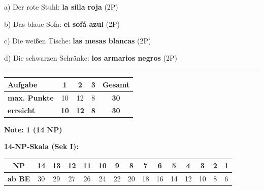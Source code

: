 \documentclass[11pt, a4paper]{article}
\newcommand{\lsg}[1]{\textcolor{loesung}{\textbf{#1}}}
\begin{document}
\noindent
a) Der rote Stuhl: \lsg{la silla roja} \hfill (2P)

\vspace{0.8em}

\noindent
b) Das blaue Sofa: \lsg{el sofá azul} \hfill (2P)

\vspace{0.8em}

\noindent
c) Die weißen Tische: \lsg{las mesas blancas} \hfill (2P)

\vspace{0.8em}

\noindent
d) Die schwarzen Schränke: \lsg{los armarios negros} \hfill (2P)


\vspace{25pt}
\hrule
\vspace{10pt}

\noindent
\begin{tabularx}{\textwidth}{|X|c|c|c||c|}
\hline
\textbf{Aufgabe} & 1 & 2 & 3 & \textbf{Gesamt} \\
\hline
\textbf{max. Punkte} & 10 & 12 & 8 & \textbf{30} \\
\hline
\textbf{erreicht} & \lsg{10} & \lsg{12} & \lsg{8} & \lsg{30} \\
\hline
\end{tabularx}

\vspace{10pt}

\begin{flushright}
\textbf{Note:} \lsg{1 (14 NP)}
\end{flushright}

\vspace{1em}

\textbf{14-NP-Skala (Sek I):}

\begin{tabular}{|c|c|c|c|c|c|c|c|c|c|c|c|c|c|c|}
\hline
\textbf{NP} & 14 & 13 & 12 & 11 & 10 & 9 & 8 & 7 & 6 & 5 & 4 & 3 & 2 & 1 \\
\hline
\textbf{ab BE} & 30 & 29 & 27 & 26 & 24 & 22 & 20 & 18 & 16 & 14 & 12 & 10 & 8 & 6 \\
\hline
\end{tabular}
\end{document}
